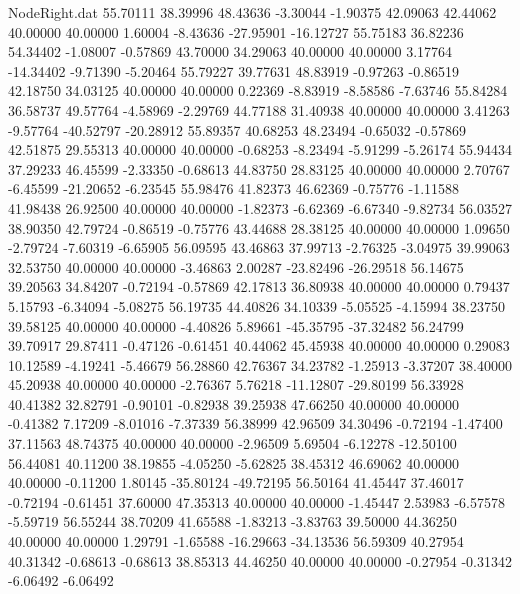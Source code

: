 \begin{filecontents}{NodeRight.dat}
  55.70111   38.39996   48.43636    -3.30044   -1.90375   42.09063   42.44062   40.00000   40.00000    1.60004   -8.43636  -27.95901  -16.12727
  55.75183   36.82236   54.34402    -1.08007   -0.57869   43.70000   34.29063   40.00000   40.00000    3.17764  -14.34402   -9.71390   -5.20464
  55.79227   39.77631   48.83919    -0.97263   -0.86519   42.18750   34.03125   40.00000   40.00000    0.22369   -8.83919   -8.58586   -7.63746
  55.84284   36.58737   49.57764    -4.58969   -2.29769   44.77188   31.40938   40.00000   40.00000    3.41263   -9.57764  -40.52797  -20.28912
  55.89357   40.68253   48.23494    -0.65032   -0.57869   42.51875   29.55313   40.00000   40.00000   -0.68253   -8.23494   -5.91299   -5.26174
  55.94434   37.29233   46.45599    -2.33350   -0.68613   44.83750   28.83125   40.00000   40.00000    2.70767   -6.45599  -21.20652   -6.23545
  55.98476   41.82373   46.62369    -0.75776   -1.11588   41.98438   26.92500   40.00000   40.00000   -1.82373   -6.62369   -6.67340   -9.82734
  56.03527   38.90350   42.79724    -0.86519   -0.75776   43.44688   28.38125   40.00000   40.00000    1.09650   -2.79724   -7.60319   -6.65905
  56.09595   43.46863   37.99713    -2.76325   -3.04975   39.99063   32.53750   40.00000   40.00000   -3.46863    2.00287  -23.82496  -26.29518
  56.14675   39.20563   34.84207    -0.72194   -0.57869   42.17813   36.80938   40.00000   40.00000    0.79437    5.15793   -6.34094   -5.08275
  56.19735   44.40826   34.10339    -5.05525   -4.15994   38.23750   39.58125   40.00000   40.00000   -4.40826    5.89661  -45.35795  -37.32482
  56.24799   39.70917   29.87411    -0.47126   -0.61451   40.44062   45.45938   40.00000   40.00000    0.29083   10.12589   -4.19241   -5.46679
  56.28860   42.76367   34.23782    -1.25913   -3.37207   38.40000   45.20938   40.00000   40.00000   -2.76367    5.76218  -11.12807  -29.80199
  56.33928   40.41382   32.82791    -0.90101   -0.82938   39.25938   47.66250   40.00000   40.00000   -0.41382    7.17209   -8.01016   -7.37339
  56.38999   42.96509   34.30496    -0.72194   -1.47400   37.11563   48.74375   40.00000   40.00000   -2.96509    5.69504   -6.12278  -12.50100
  56.44081   40.11200   38.19855    -4.05250   -5.62825   38.45312   46.69062   40.00000   40.00000   -0.11200    1.80145  -35.80124  -49.72195
  56.50164   41.45447   37.46017    -0.72194   -0.61451   37.60000   47.35313   40.00000   40.00000   -1.45447    2.53983   -6.57578   -5.59719
  56.55244   38.70209   41.65588    -1.83213   -3.83763   39.50000   44.36250   40.00000   40.00000    1.29791   -1.65588  -16.29663  -34.13536
  56.59309   40.27954   40.31342    -0.68613   -0.68613   38.85313   44.46250   40.00000   40.00000   -0.27954   -0.31342   -6.06492   -6.06492

\end{filecontents}
